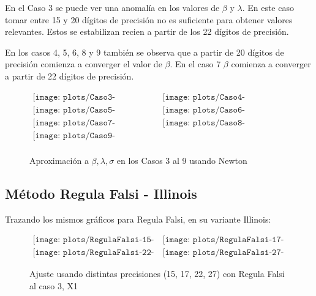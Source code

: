 En el Caso 3 se puede ver una anomal\'ia en los valores de $\beta$ y $\lambda$. 
En este caso tomar entre 15 y 20 d\'igitos de precisi\'on no es suficiente para 
obtener valores relevantes. Estos se estabilizan recien a partir de los 22 
d\'igitos de precisi\'on.


En los casos 4, 5, 6, 8 y 9 tambi\'en se observa que a partir de 20 d\'igitos 
de precisi\'on comienza a converger el valor de $\beta$. 
En el caso 7 $\beta$ comienza a converger a partir de 22 d\'igitos de precisi\'on.

\begin{figure}
$\begin{array}{cc}
\texttt{[image: plots/Caso3-Newton.png]} &
\texttt{[image: plots/Caso4-Newton.png]} \\
\texttt{[image: plots/Caso5-Newton.png]} &
\texttt{[image: plots/Caso6-Newton.png]} \\
\texttt{[image: plots/Caso7-Newton.png]} &
\texttt{[image: plots/Caso8-Newton.png]} \\
\texttt{[image: plots/Caso9-Newton.png]} &\\
\end{array}$

\caption{Aproximaci\'on a $\beta, \lambda, \sigma$ en los Casos 3 al 9 
usando Newton}
\label{fig:AproxCasosNewton}
\end{figure}

\subsection{M\'etodo Regula Falsi - Illinois}

Trazando los mismos gr\'aficos para Regula Falsi, en su variante Illinois:

\begin{figure} [H]
$\begin{array}{cc}
\texttt{[image: plots/RegulaFalsi-15-caso3.png]} &
\texttt{[image: plots/RegulaFalsi-17-caso3.png]} \\
\texttt{[image: plots/RegulaFalsi-22-caso3.png]} &
\texttt{[image: plots/RegulaFalsi-27-caso3.png]}
\end{array}$
\caption{Ajuste usando distintas precisiones (15, 17, 22, 27) con 
Regula Falsi al caso 3, X1}
\label{fig:FitCaso3RegulaFalsi}
\end{figure}

